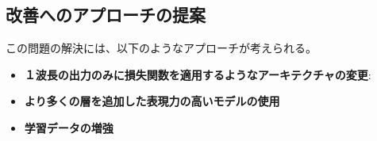     \subsection{改善へのアプローチの提案}
      この問題の解決には、以下のようなアプローチが考えられる。
      \begin{itemize}
        \item \textbf{１波長の出力のみに損失関数を適用するようなアーキテクチャの変更}: 
        \item \textbf{より多くの層を追加した表現力の高いモデルの使用}
        \item \textbf{学習データの増強}
      \end{itemize}
    
    
    
